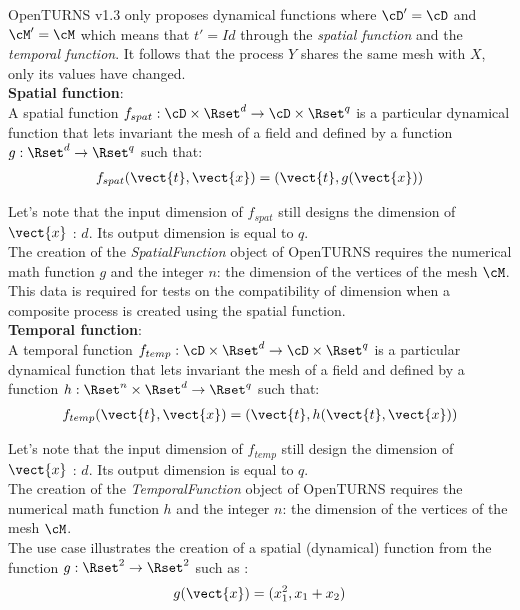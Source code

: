 OpenTURNS v1.3 only proposes dynamical functions where $\cD'=\cD$ and $\cM'=\cM$ which means that $t'=Id$ through the {\itshape spatial function} and the {\itshape temporal function}. It follows that the process $Y$ shares the same mesh with $X$, only its values have changed.\\

{\bf Spatial function}:\\
A spatial function $f_{spat}: \cD \times \Rset^d \rightarrow \cD \times \Rset^q$ is a particular dynamical function that lets invariant the mesh of a field and defined by a function $g : \Rset^d  \rightarrow \Rset^q$ such that:
\begin{align}\label{spatFunc}
  f_{spat}(\vect{t}, \vect{x})=(\vect{t}, g(\vect{x}))
\end{align}

Let's note that the input dimension of $f_{spat}$  still designs the dimension of $\vect{x}$ : $d$. Its output dimension is equal to $q$.\\

The creation of the \emph{SpatialFunction} object of OpenTURNS requires the numerical math function $g$ and the integer $n$: the dimension of the vertices of the mesh $\cM$. This data is required for tests on the compatibility of dimension when a composite process is created using the spatial function.\\


{\bf Temporal function}:\\
A temporal function $f_{temp}: \cD \times \Rset^d \rightarrow \cD \times \Rset^q$ is a particular dynamical function that lets invariant the mesh of a field and defined by a function $h :  \Rset^n \times \Rset^d  \rightarrow \Rset^q$ such that:
\begin{align}\label{tempFunc}
  f_{temp}(\vect{t}, \vect{x})=(\vect{t}, h(\vect{t},\vect{x}))
\end{align}

Let's note that the input dimension of $f_{temp}$  still design the dimension of $\vect{x}$ : $d$. Its output dimension is equal to $q$.\\


The creation of the \emph{TemporalFunction} object of OpenTURNS requires the numerical math function $h$ and the integer $n$: the dimension of the vertices of the mesh $\cM$.\\



The use case illustrates the creation of a spatial (dynamical) function from the function $g: \Rset^2  \rightarrow \Rset^2$ such as :
\begin{align}
  g(\vect{x})=(x_1^2, x_1+x_2)
\end{align}


